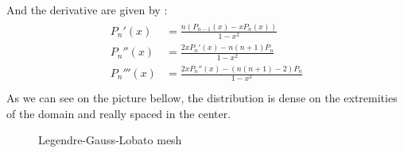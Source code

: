 And the derivative are given by : 
\begin{align*}
\begin{split}
P_n'(x) &= \frac{n(P_{n-1}(x)-xP_n(x))}{1-x^2}\\
P_n''(x) &= \frac{2xP_n'(x)-n(n+1)P_n}{1-x^2}\\
P_n'''(x) &= \frac{2xP_n''(x)-(n(n+1)-2)P_n}{1-x^2}\\
\end{split}
\end{align*}
As we can see on the picture bellow, the distribution is dense on the extremities of the domain and really spaced in the center. \\
\newpage
\begin{figure}[!h]
\hspace{-1.3cm}
\begin{minipage}{.5\linewidth}
\centering
{}
\end{minipage}
\hfill
\begin{minipage}{.5\linewidth}
\centering
{}
\end{minipage}
\vspace{0.5cm}
\hspace{-1.3cm}
\begin{minipage}{.5\linewidth}
\centering
{}
\end{minipage}
\hfill
\begin{minipage}{.5\linewidth}
\centering
{} 
\end{minipage}
\vspace{0.5cm}
\hspace{-1.3cm}
\begin{minipage}{.5\linewidth}
\centering
{}
\end{minipage}
\hfill
\begin{minipage}{.5\linewidth}
\centering
{}
\end{minipage}
\caption{\label{fig:lglDistribution}Legendre-Gauss-Lobato mesh}
\end{figure}

